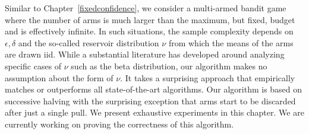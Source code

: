 Similar to Chapter~\ref{fixedconfidence}, we consider a multi-armed bandit game where the number of arms is much larger than the maximum, but fixed, budget and is effectively infinite.
In such situations, the sample complexity depends on $\epsilon, \delta$ and the so-called reservoir distribution $\nu$ from which the means of the arms are drawn iid. 
While a substantial literature has developed around analyzing specific cases of $\nu$ such as the beta distribution, our algorithm makes no assumption about the form of $\nu$. It takes a surprising approach that empirically matches or outperforms all state-of-the-art algorithms. 
Our algorithm is based on successive halving with the surprising exception that arms start to be discarded after just a single pull. We present exhaustive experiments in this chapter. We are currently working on proving the correctness of this algorithm.





\clearpage

\clearpage

%

